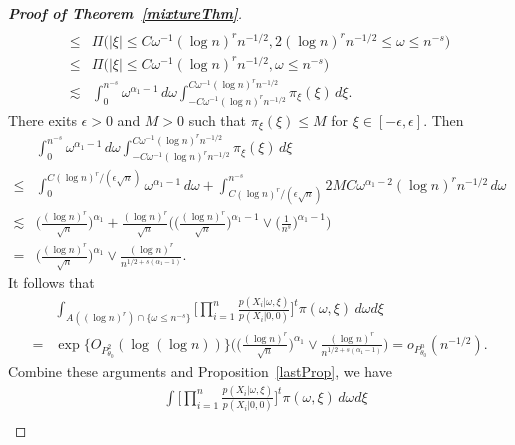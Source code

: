 \documentclass[11pt]{article}
\theoremstyle{plain}
\theoremstyle{definition}
\theoremstyle{remark}
\begin{document}
\begin{appendices}
\begin{proof}[\textbf{Proof of Theorem~\ref{mixtureThm}}]
\begin{align*}
    \\
    \leq
    &\Pi\big(|\xi|\leq C \omega^{-1} (\log n)^r n^{-1/2},   2(\log n)^r n^{-1/2} \leq \omega\leq n^{-s}\big)
    \\
    \leq
    &\Pi\big(|\xi|\leq C \omega^{-1} (\log n)^r n^{-1/2},\omega\leq n^{-s}\big)
    \\
    \lesssim &
    \int_{0}^{n^{-s}} \omega^{\alpha_1-1}\, d\omega
    \int_{-C \omega^{-1} (\log n)^r n^{-1/2}}^{C \omega^{-1} (\log n)^r n^{-1/2}} \pi_{\xi}(\xi) \, d\xi.
\end{align*}
There exits $\epsilon>0$ and $M>0$ such that $\pi_{\xi}(\xi)\leq M$ for $\xi\in [-\epsilon,\epsilon]$. Then
\begin{align*}
    &\int_{0}^{n^{-s}} \omega^{\alpha_1-1}\, d\omega
    \int_{-C \omega^{-1} (\log n)^r n^{-1/2}}^{C \omega^{-1} (\log n)^r n^{-1/2}} \pi_{\xi}(\xi) \, d\xi
    \\
    \leq &
    \int_{0}^{{C(\log n)^r}/{(\epsilon \sqrt{n})}} \omega^{\alpha_1-1}\, d\omega
    +
    \int_{{C(\log n)^r}/{(\epsilon \sqrt{n})}}^{n^{-s}} 
    2MC \omega^{\alpha_1-2}(\log n)^r n^{-1/2}
    \, d\omega
    \\
    \lesssim &
     \Big(\frac{(\log n)^r}{\sqrt{n}}\Big)^{\alpha_1}
     +\frac{(\log n)^r}{\sqrt{n}}\Bigg(\Big(\frac{(\log n)^r}{\sqrt{n}}\Big)^{\alpha_1-1}\vee \Big(\frac{1}{n^{s}}\Big)^{\alpha_1-1}\Bigg)
     \\
    = &
    \Big(\frac{(\log n)^r}{\sqrt{n}}\Big)^{\alpha_1}\vee \frac{(\log n)^r}{n^{1/2+s(\alpha_1-1)}}.
\end{align*}
It follows that
\begin{align*}
    & \int_{A( (\log n)^r )\cap \{\omega\leq n^{-s}\}} \Big[\prod_{i=1}^n \frac{p(X_i|\omega,\xi)}{p(X_i|0,0)}\Big]^t \pi(\omega,\xi)\, d\omega d\xi
    \\
    =&\exp\big\{O_{P^2_{\theta_0}}(\log(\log n))\big\}
    \Bigg(\Big(\frac{(\log n)^r}{\sqrt{n}}\Big)^{\alpha_1}\vee \frac{(\log n)^r}{n^{1/2+s(\alpha_1-1)}}\Bigg)=o_{P^n_{\theta_0}}(n^{-1/2}).
\end{align*}
Combine these arguments and Proposition~\ref{lastProp}, we have
\begin{align*}
    & \int \Big[\prod_{i=1}^n \frac{p(X_i|\omega,\xi)}{p(X_i|0,0)}\Big]^t \pi(\omega,\xi)\, d\omega d\xi
    \\

\end{align*}
\end{proof}
\end{appendices}
\end{document}
